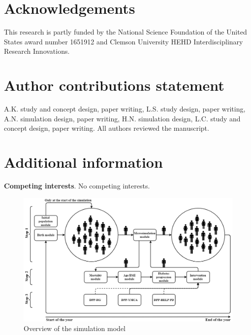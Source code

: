 \documentclass[fleqn,10pt]{wlscirep}
\begin{document}


\section*{Acknowledgements}

This research is partly funded by the National Science Foundation of the United States award number 1651912 and Clemson University HEHD Interdisciplinary Research Innovations.

\section*{Author contributions statement}
A.K. study and concept design, paper writing, L.S. study design, paper writing, A.N. simulation design, paper writing, H.N. simulation design, L.C. study and concept design, paper writing. All authors reviewed the manuscript.

\section*{Additional information}

\textbf{Competing interests}. 
No competing interests.

\begin{figure}[ht]
\centering
\includegraphics[width=\linewidth]{Fig1-model.png}
\caption{Overview of the simulation model}
\label{fig:model}
\end{figure}
\end{document}
